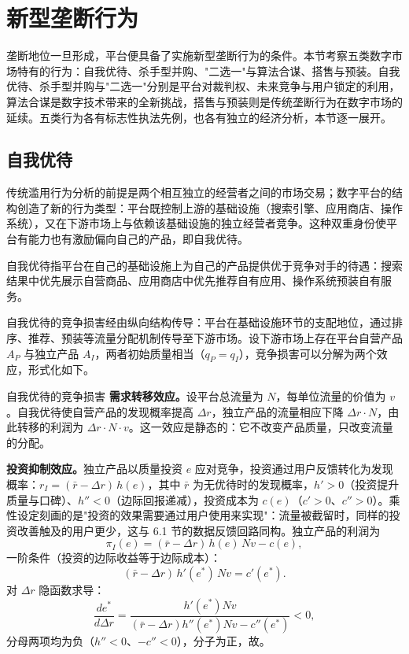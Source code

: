 \section{新型垄断行为}

垄断地位一旦形成，平台便具备了实施新型垄断行为的条件。本节考察五类数字市场特有的行为：自我优待、杀手型并购、"二选一"与算法合谋、搭售与预装。自我优待、杀手型并购与"二选一"分别是平台对裁判权、未来竞争与用户锁定的利用，算法合谋是数字技术带来的全新挑战，搭售与预装则是传统垄断行为在数字市场的延续。五类行为各有标志性执法先例，也各有独立的经济分析，本节逐一展开。

\subsection{自我优待}

传统滥用行为分析的前提是两个相互独立的经营者之间的市场交易；数字平台的结构创造了新的行为类型：平台既控制上游的基础设施（搜索引擎、应用商店、操作系统），又在下游市场上与依赖该基础设施的独立经营者竞争。这种双重身份使平台有能力也有激励偏向自己的产品，即自我优待。

\begin{definition}
自我优待指平台在自己的基础设施上为自己的产品提供优于竞争对手的待遇：搜索结果中优先展示自营商品、应用商店中优先推荐自有应用、操作系统预装自有服务。
\end{definition}

自我优待的竞争损害经由纵向结构传导：平台在基础设施环节的支配地位，通过排序、推荐、预装等流量分配机制传导至下游市场。设下游市场上存在平台自营产品 $A_P$ 与独立产品 $A_I$，两者初始质量相当（$q_P = q_I$），竞争损害可以分解为两个效应，形式化如下。

\begin{derivation}{自我优待的竞争损害}{}
\textbf{需求转移效应。}设平台总流量为 $N$，每单位流量的价值为 $v$。自我优待使自营产品的发现概率提高 $\Delta r$，独立产品的流量相应下降 $\Delta r \cdot N$，由此转移的利润为 $\Delta r \cdot N \cdot v$。这一效应是静态的：它不改变产品质量，只改变流量的分配。

\textbf{投资抑制效应。}独立产品以质量投资 $e$ 应对竞争，投资通过用户反馈转化为发现概率：$r_I = (\bar r - \Delta r)\, h(e)$，其中 $\bar r$ 为无优待时的发现概率，$h' > 0$（投资提升质量与口碑）、$h'' < 0$（边际回报递减），投资成本为 $c(e)$（$c' > 0$、$c'' > 0$）。乘性设定刻画的是"投资的效果需要通过用户使用来实现"：流量被截留时，同样的投资改善触及的用户更少，这与 6.1 节的数据反馈回路同构。独立产品的利润为
\[
\pi_I(e) = (\bar r - \Delta r)\, h(e)\, N v - c(e),
\]
一阶条件（投资的边际收益等于边际成本）：
\[
(\bar r - \Delta r)\, h'(e^*)\, N v = c'(e^*).
\]
对 $\Delta r$ 隐函数求导：
\[
\frac{de^*}{d\Delta r} = \frac{h'(e^*) N v}{(\bar r - \Delta r) h''(e^*) N v - c''(e^*)} < 0,
\]
分母两项均为负（$h'' < 0$、$-c'' < 0$），分子为正，故。
\end{derivation}

